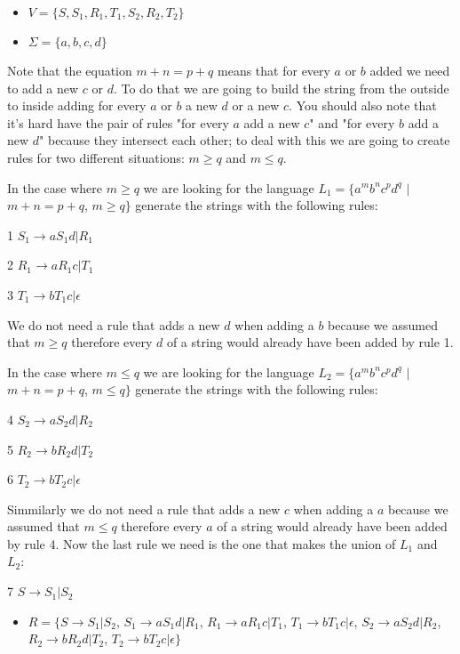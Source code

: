 \documentclass[11pt]{article}
\begin{document}
\begin{itemize}
    \item{$V = \{S, S_1, R_1, T_1, S_2, R_2, T_2\}$}
    \item{$\Sigma = \{a, b, c, d\}$}
\end{itemize}
    
\par Note that the equation $m + n = p + q$ means that for every $a$ or $b$ added we need to add a new $c$ or $d$. To do that we are going to build the string from the outside to inside adding for every $a$ or $b$ a new $d$ or a new $c$. You should also note that it's hard have the pair of rules "for every $a$ add a new $c$" and "for every $b$ add a new $d$" because they intersect each other; to deal with this we are going to create rules for two different situations: $m \geq q$ and $m \leq q$.
\par In the case where $m \geq q$ we are looking for the language $L_1 = \{a^mb^nc^pd^q$ $|$ $m + n = p + q$, $m \geq q\} $ generate the strings with the following rules:
\par 1 $S_1 \rightarrow aS_1d | R_1$
\par 2 $R_1 \rightarrow aR_1c | T_1$
\par 3 $T_1 \rightarrow bT_1c | \epsilon$
\par We do not need a rule that adds a new $d$ when adding a $b$ because we assumed that $m \geq q$ therefore every $d$ of a string would already have been added by rule 1.
\par In the case where $m \leq q$ we are looking for the language $L_2 = \{a^mb^nc^pd^q$ $|$ $m + n = p + q$, $m \leq q\} $ generate the strings with the following rules:
\par 4 $S_2 \rightarrow aS_2d | R_2$
\par 5 $R_2 \rightarrow bR_2d | T_2$
\par 6 $T_2 \rightarrow bT_2c | \epsilon$
\par Simmilarly we do not need a rule that adds a new $c$ when adding a $a$ because we assumed that $m \leq q$ therefore every $a$ of a string would already have been added by rule 4.
    Now the last rule we need is the one that makes the union of $L_1$ and $L_2$: 
\par 7 $S \rightarrow S_1 | S_2$

\begin{itemize}    
    \item{$R = \{S \rightarrow S_1 | S_2$, 
        $S_1 \rightarrow aS_1d | R_1$,
        $R_1 \rightarrow aR_1c | T_1$,
        $T_1 \rightarrow bT_1c | \epsilon$,
        $S_2 \rightarrow aS_2d | R_2$,
        $R_2 \rightarrow bR_2d | T_2$,
        $T_2 \rightarrow bT_2c | \epsilon\}$
      }
\end{itemize}
\end{document}
